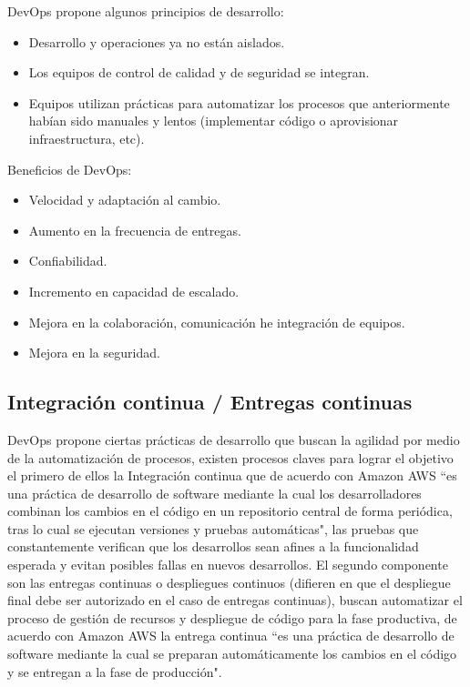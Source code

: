 DevOps propone algunos principios de desarrollo: 

\begin{itemize}
    \item Desarrollo y operaciones ya no están aislados.
    \item Los equipos de control de calidad y de seguridad se integran.
    \item Equipos utilizan prácticas para automatizar los procesos que anteriormente habían sido manuales y lentos (implementar código o aprovisionar infraestructura, etc).
\end{itemize}

Beneficios de DevOps:

\begin{itemize}
    \item Velocidad y adaptación al cambio.
    \item Aumento en la frecuencia de entregas.
    \item Confiabilidad.
    \item Incremento en capacidad de escalado.
    \item Mejora en la colaboración, comunicación he integración de equipos.
    \item Mejora en la seguridad.
\end{itemize}

\subsection{Integración continua / Entregas continuas}

DevOps propone ciertas prácticas de desarrollo que buscan la agilidad por medio de la automatización de procesos, existen procesos claves para lograr el objetivo el primero de ellos la Integración continua que de acuerdo con Amazon AWS \cite{awsIC} ``es una práctica de desarrollo de software mediante la cual los desarrolladores combinan los cambios en el código en un repositorio central de forma periódica, tras lo cual se ejecutan versiones y pruebas automáticas", las pruebas que constantemente verifican que los desarrollos sean afines a la funcionalidad esperada y evitan posibles fallas en nuevos desarrollos. El segundo componente son las entregas continuas o despliegues continuos (difieren en que el despliegue final debe ser autorizado en el caso de entregas continuas), buscan automatizar el proceso de gestión de recursos y despliegue de código para la fase productiva, de acuerdo con Amazon AWS \cite{awsEC} la entrega continua ``es una práctica de desarrollo de software mediante la cual se preparan automáticamente los cambios en el código y se entregan a la fase de producción".

